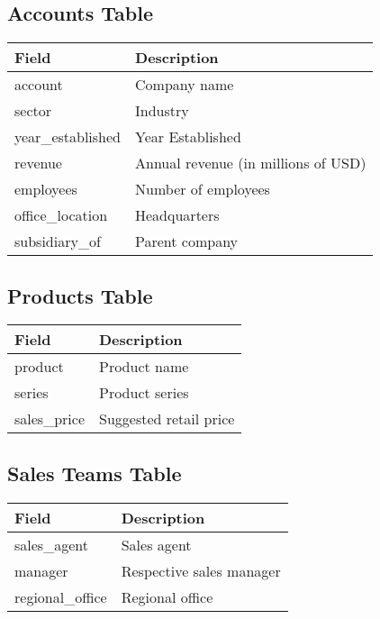 \documentclass{article}
\begin{document}
\subsection{Accounts Table}
\begin{longtable}{|l|l|}
\hline
\textbf{Field} & \textbf{Description} \\ \hline
account & Company name \\ \hline
sector & Industry \\ \hline
year\_established & Year Established \\ \hline
revenue & Annual revenue (in millions of USD) \\ \hline
employees & Number of employees \\ \hline
office\_location & Headquarters \\ \hline
subsidiary\_of & Parent company \\ \hline
\end{longtable}

\subsection{Products Table}
\begin{longtable}{|l|l|}
\hline
\textbf{Field} & \textbf{Description} \\ \hline
product & Product name \\ \hline
series & Product series \\ \hline
sales\_price & Suggested retail price \\ \hline
\end{longtable}

\subsection{Sales Teams Table}
\begin{longtable}{|l|l|}
\hline
\textbf{Field} & \textbf{Description} \\ \hline
sales\_agent & Sales agent \\ \hline
manager & Respective sales manager \\ \hline
regional\_office & Regional office \\ \hline
\end{longtable}
\end{document}
